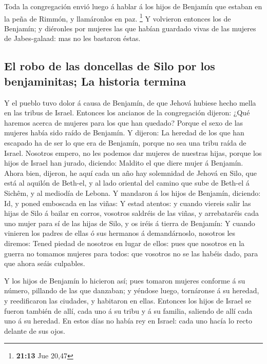  Toda la congregación envió luego á hablar á los hijos de
Benjamín que estaban en la peña de Rimmón, y llamáronlos en paz.
\footnote{\textbf{21:13} Jue 20,47}  Y volvieron entonces
los de Benjamín; y diéronles por mujeres las que habían guardado vivas
de las mujeres de Jabes-galaad: mas no les bastaron éstas.

\hypertarget{el-robo-de-las-doncellas-de-silo-por-los-benjaminitas-la-historia-termina}{%
\subsection{El robo de las doncellas de Silo por los benjaminitas; La
historia
termina}\label{el-robo-de-las-doncellas-de-silo-por-los-benjaminitas-la-historia-termina}}

 Y el pueblo tuvo dolor á causa de Benjamín, de que Jehová
hubiese hecho mella en las tribus de Israel.  Entonces los
ancianos de la congregación dijeron: ¿Qué haremos acerca de mujeres para
los que han quedado? Porque el sexo de las mujeres había sido raído de
Benjamín.  Y dijeron: La heredad de los que han escapado ha
de ser lo que era de Benjamín, porque no sea una tribu raída de Israel.
 Nosotros empero, no les podemos dar mujeres de nuestras
hijas, porque los hijos de Israel han jurado, diciendo: Maldito el que
diere mujer á Benjamín.  Ahora bien, dijeron, he aquí cada
un año hay solemnidad de Jehová en Silo, que está al aquilón de Beth-el,
y al lado oriental del camino que sube de Beth-el á Sichêm, y al
mediodía de Lebona.  Y mandaron á los hijos de Benjamín,
diciendo: Id, y poned emboscada en las viñas:  Y estad
atentos: y cuando viereis salir las hijas de Silo á bailar en corros,
vosotros saldréis de las viñas, y arrebataréis cada uno mujer para sí de
las hijas de Silo, y os iréis á tierra de Benjamín:  Y
cuando vinieren los padres de ellas ó sus hermanos á demandárnoslo,
nosotros les diremos: Tened piedad de nosotros en lugar de ellos: pues
que nosotros en la guerra no tomamos mujeres para todos: que vosotros no
se las habéis dado, para que ahora seáis culpables.

 Y los hijos de Benjamín lo hicieron así; pues tomaron
mujeres conforme á su número, pillando de las que danzaban; y yéndose
luego, tornáronse á su heredad, y reedificaron las ciudades, y habitaron
en ellas.  Entonces los hijos de Israel se fueron también
de allí, cada uno á su tribu y á su familia, saliendo de allí cada uno á
su heredad.  En estos días no había rey en Israel: cada uno
hacía lo recto delante de sus ojos.

